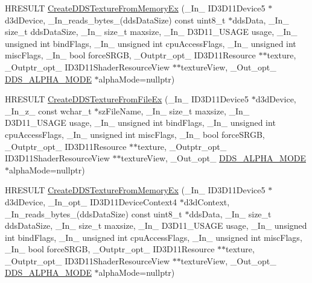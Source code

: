 \begin{DoxyCompactItemize}
\item 
H\+R\+E\+S\+U\+LT \hyperlink{namespace_direct_x_a6f0ebf43e98fbd6d1483bec60bcefa5f}{Create\+D\+D\+S\+Texture\+From\+Memory\+Ex} (\+\_\+\+In\+\_\+ I\+D3\+D11\+Device5 $\ast$d3d\+Device, \+\_\+\+In\+\_\+reads\+\_\+bytes\+\_\+(dds\+Data\+Size) const uint8\+\_\+t $\ast$dds\+Data, \+\_\+\+In\+\_\+ size\+\_\+t dds\+Data\+Size, \+\_\+\+In\+\_\+ size\+\_\+t maxsize, \+\_\+\+In\+\_\+ D3\+D11\+\_\+\+U\+S\+A\+GE usage, \+\_\+\+In\+\_\+ unsigned int bind\+Flags, \+\_\+\+In\+\_\+ unsigned int cpu\+Access\+Flags, \+\_\+\+In\+\_\+ unsigned int misc\+Flags, \+\_\+\+In\+\_\+ bool force\+S\+R\+GB, \+\_\+\+Outptr\+\_\+opt\+\_\+ I\+D3\+D11\+Resource $\ast$$\ast$texture, \+\_\+\+Outptr\+\_\+opt\+\_\+ I\+D3\+D11\+Shader\+Resource\+View $\ast$$\ast$texture\+View, \+\_\+\+Out\+\_\+opt\+\_\+ \hyperlink{namespace_direct_x_a7cb48689d75471680c0bf7f79caaaf1f}{D\+D\+S\+\_\+\+A\+L\+P\+H\+A\+\_\+\+M\+O\+DE} $\ast$alpha\+Mode=nullptr)
\item 
H\+R\+E\+S\+U\+LT \hyperlink{namespace_direct_x_a18b0c47d9e37030384d91e8c94ec49b8}{Create\+D\+D\+S\+Texture\+From\+File\+Ex} (\+\_\+\+In\+\_\+ I\+D3\+D11\+Device5 $\ast$d3d\+Device, \+\_\+\+In\+\_\+z\+\_\+ const wchar\+\_\+t $\ast$sz\+File\+Name, \+\_\+\+In\+\_\+ size\+\_\+t maxsize, \+\_\+\+In\+\_\+ D3\+D11\+\_\+\+U\+S\+A\+GE usage, \+\_\+\+In\+\_\+ unsigned int bind\+Flags, \+\_\+\+In\+\_\+ unsigned int cpu\+Access\+Flags, \+\_\+\+In\+\_\+ unsigned int misc\+Flags, \+\_\+\+In\+\_\+ bool force\+S\+R\+GB, \+\_\+\+Outptr\+\_\+opt\+\_\+ I\+D3\+D11\+Resource $\ast$$\ast$texture, \+\_\+\+Outptr\+\_\+opt\+\_\+ I\+D3\+D11\+Shader\+Resource\+View $\ast$$\ast$texture\+View, \+\_\+\+Out\+\_\+opt\+\_\+ \hyperlink{namespace_direct_x_a7cb48689d75471680c0bf7f79caaaf1f}{D\+D\+S\+\_\+\+A\+L\+P\+H\+A\+\_\+\+M\+O\+DE} $\ast$alpha\+Mode=nullptr)
\item 
H\+R\+E\+S\+U\+LT \hyperlink{namespace_direct_x_a9d40fdba8cb2ede9ac3224e911eb73af}{Create\+D\+D\+S\+Texture\+From\+Memory\+Ex} (\+\_\+\+In\+\_\+ I\+D3\+D11\+Device5 $\ast$d3d\+Device, \+\_\+\+In\+\_\+opt\+\_\+ I\+D3\+D11\+Device\+Context4 $\ast$d3d\+Context, \+\_\+\+In\+\_\+reads\+\_\+bytes\+\_\+(dds\+Data\+Size) const uint8\+\_\+t $\ast$dds\+Data, \+\_\+\+In\+\_\+ size\+\_\+t dds\+Data\+Size, \+\_\+\+In\+\_\+ size\+\_\+t maxsize, \+\_\+\+In\+\_\+ D3\+D11\+\_\+\+U\+S\+A\+GE usage, \+\_\+\+In\+\_\+ unsigned int bind\+Flags, \+\_\+\+In\+\_\+ unsigned int cpu\+Access\+Flags, \+\_\+\+In\+\_\+ unsigned int misc\+Flags, \+\_\+\+In\+\_\+ bool force\+S\+R\+GB, \+\_\+\+Outptr\+\_\+opt\+\_\+ I\+D3\+D11\+Resource $\ast$$\ast$texture, \+\_\+\+Outptr\+\_\+opt\+\_\+ I\+D3\+D11\+Shader\+Resource\+View $\ast$$\ast$texture\+View, \+\_\+\+Out\+\_\+opt\+\_\+ \hyperlink{namespace_direct_x_a7cb48689d75471680c0bf7f79caaaf1f}{D\+D\+S\+\_\+\+A\+L\+P\+H\+A\+\_\+\+M\+O\+DE} $\ast$alpha\+Mode=nullptr)

\end{DoxyCompactItemize}
